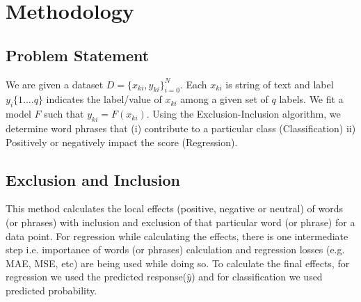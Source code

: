 \documentclass[11pt]{article}
\begin{document}
%
% 





\section{Methodology}

\subsection {Problem Statement}

We are given a dataset $D = \{x_{ki}, y_{ki}\}_{i=0}^N$. Each $x_{ki}$ is string of text and label $y_i  \{1....q\}$ indicates the label/value of $x_{ki}$ among a given set of $q$ labels. We fit a model $F$ such that $y_{ki} = F(x_{ki})$.  Using the Exclusion-Inclusion algorithm, we determine word phrases that (i) contribute to a particular class (Classification) ii) Positively or negatively impact the score (Regression). 

\subsection { Exclusion and Inclusion }
This method calculates the local effects (positive, negative or neutral) of words (or phrases) with inclusion and  exclusion of that particular word (or phrase) for a data point. For regression while calculating the effects, there is one intermediate step i.e. importance of words (or phrases) calculation and regression losses (e.g. MAE, MSE, etc) are being used while doing so. To calculate the final effects, for regression we used the predicted response($\hat{y}$) and for classification we used predicted probability. 
\end{document}
